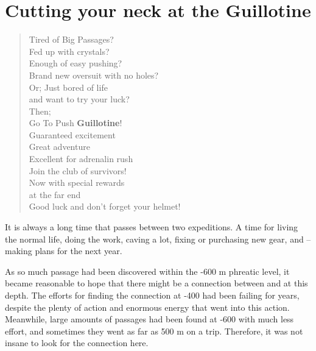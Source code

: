 \section{Cutting your neck at the Guillotine}


\begin{verse}
\begin{centering}
Tired of Big Passages? \\
Fed up with crystals? \\
Enough of easy pushing? \\
Brand new oversuit with no holes? \\

Or; Just bored of life \\
   and want to try your luck? \\

Then; \\ 

Go To Push \textbf{Guillotine}! \\

Guaranteed excitement \\
Great adventure \\
Excellent for adrenalin rush \\

Join the club of survivors! \\

Now with special rewards \\
at the far end \\

Good luck and don't forget your helmet!\\
 \end{centering} 
\end{verse}


It is always a long time that passes between two expeditions. A time for
living the normal life, doing the work, caving a lot, fixing or
purchasing new gear, and -- making plans for the next year.

As so much passage had been discovered within the -600 m phreatic level,
it became reasonable to hope that there might be a connection between
 and  at this depth. The
efforts for finding the connection at -400 had been failing for years,
despite the plenty of action and enormous energy that went into this
action. Meanwhile, large amounts of passages had been found at -600 with
much less effort, and sometimes they went as far as 500 m on a trip.
Therefore, it was not insane to look for the connection here.

